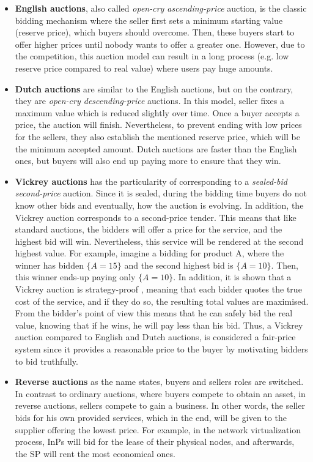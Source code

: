 \begin{itemize}
	\item \textbf{English auctions}, also called \textit{open-cry ascending-price} auction, is the classic bidding mechanism where the seller first sets a minimum starting value (reserve price), which buyers should overcome. Then, these buyers start to offer higher prices until nobody wants to offer a greater one. However, due to the competition, this auction model can result in a long process (e.g. low reserve price compared to real value) where users pay huge amounts.
	\item \textbf{Dutch auctions} are similar to the English auctions, but on the contrary, they are \textit{open-cry descending-price} auctions. In this model, seller fixes a maximum value which is reduced slightly over time. Once a buyer accepts a price, the auction will finish. Nevertheless, to prevent ending with low prices for the sellers, they also establish the mentioned reserve price, which will be the minimum accepted amount. Dutch auctions are faster than the English ones, but buyers will also end up paying more to ensure that they win.
	\item \textbf{Vickrey auctions} \cite{vickrey1961counterspeculation} has the particularity of corresponding to a \textit{sealed-bid second-price} auction. Since it is sealed, during the bidding time buyers do not know other bids and eventually, how the auction is evolving. In addition, the Vickrey auction corresponds to a second-price tender. This means that like standard auctions, the bidders will offer a price for the service, and the highest bid will win. Nevertheless, this service will be rendered at the second highest value. For example, imagine a bidding for product A, where the winner has bidden $\{A = 15\}$ and the second highest bid is $\{A = 10\}$. Then, this winner ends-up paying only $\{A = 10\}$. In addition, it is shown that a Vickrey auction is strategy-proof \cite{vickrey1961counterspeculation}, meaning that each bidder quotes the true cost of the service, and if they do so, the resulting total values are maximised. From the bidder's point of view this means that he can safely bid the real value, knowing that if he wins, he will pay less than his bid. Thus, a Vickrey auction compared to English and Dutch auctions, is considered a fair-price system since it provides a reasonable price to the buyer by motivating bidders to bid truthfully.
	\item \textbf{Reverse auctions} as the name states, buyers and sellers roles are switched. In contrast to ordinary auctions, where buyers compete to obtain an asset, in reverse auctions, sellers compete to gain a business. In other words, the seller bids for his own provided services, which in the end, will be given to the supplier offering the lowest price. For example, in the network virtualization process, InPs will bid for the lease of their physical nodes, and afterwards, the SP will rent the most economical ones.
\end{itemize}


